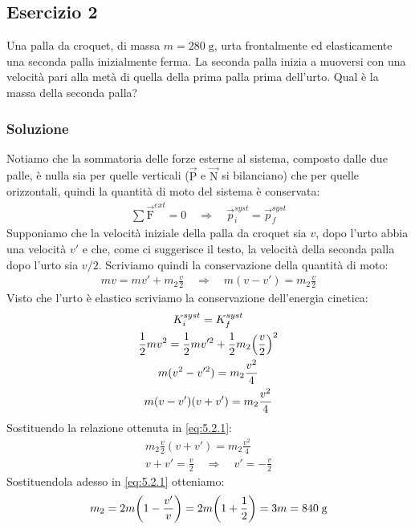 \documentclass[12pt,a4paper]{book}
\begin{document}
\subsection*{Esercizio 2}
Una palla da croquet, di massa $m=280 \; \text{g}$, urta frontalmente ed elasticamente una seconda palla inizialmente ferma. La seconda palla inizia a muoversi con una velocità pari alla metà di quella della prima palla prima dell'urto. Qual è la massa della seconda palla?


\subsubsection*{Soluzione}
Notiamo che la sommatoria delle forze esterne al sistema, composto dalle due palle, è nulla sia per quelle verticali ($\vec{\text{P}}$ e $\vec{\text{N}}$ si bilanciano) che per quelle orizzontali, quindi la quantità di moto del sistema è conservata:
%
\begin{gather*}
\sum \vec{\text{F}}^{ext}=0 \quad \Longrightarrow \quad \vec{p}_i^{syst}=\vec{p}_f^{syst}
\end{gather*}
%
Supponiamo che la velocità iniziale della palla da croquet sia $v$, dopo l'urto abbia una velocità $v'$ e che, come ci suggerisce il testo, la velocità della seconda palla dopo l'urto sia $v/2$. Scriviamo quindi la conservazione della quantità di moto:
%
\begin{gather}
mv=mv'+m_2\frac{v}{2} \quad	 \Longrightarrow \quad m(v-v')=m_2\frac{v}{2}
\label{eq:5.2.1}
\end{gather}
%
Visto che l'urto è elastico scriviamo la conservazione dell'energia cinetica:
%
\begin{gather*}
K_i^{syst}=K_f^{syst} \\
\frac{1}{2}mv^2=\frac{1}{2}mv'^2+\frac{1}{2}m_2\qty(\frac{v}{2})^2 \\
m(v^2-v'^2)=m_2\frac{v^2}{4} \\
m(v-v')(v+v')=m_2\frac{v^2}{4}
\end{gather*}
%
Sostituendo la relazione ottenuta in \ref{eq:5.2.1}:
%
\begin{gather*}
m_2\frac{v}{2}(v+v')=m_2\frac{v^2}{4} \\
v+v'=\frac{v}{2} \quad \Longrightarrow \quad v'=-\frac{v}{2}
\end{gather*}
%
Sostituendola adesso in \ref{eq:5.2.1} otteniamo:
%
\begin{gather*}
m_2=2m \qty(1-\frac{v'}{v})=2m\qty(1+\frac{1}{2})=3m = 840 \; \text{g}
\end{gather*}
%
\end{document}

